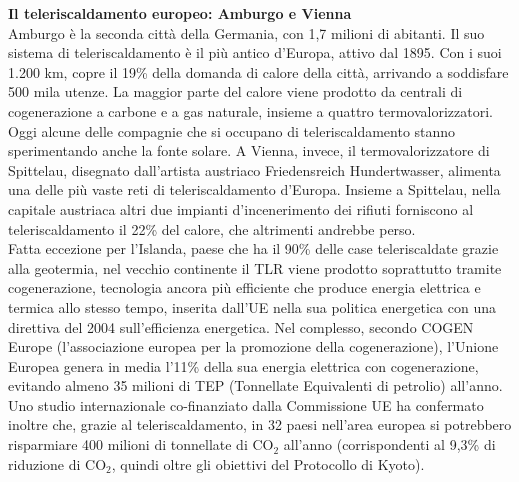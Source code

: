 \documentclass[laurea,oneside,11pt]{USiena_tesiLM}
\begin{document}
\noindent\textbf{Il teleriscaldamento europeo: Amburgo e Vienna}\\
\noindent Amburgo è la seconda città della Germania, con 1,7 milioni di abitanti. Il suo sistema di teleriscaldamento è il più antico d'Europa, attivo dal 1895. Con i suoi 1.200 km, copre il 19\% della domanda di calore della città, arrivando a soddisfare 500 mila utenze. La maggior parte del calore viene prodotto da centrali di cogenerazione a carbone e a gas naturale, insieme a quattro termovalorizzatori. Oggi alcune delle compagnie che si occupano di teleriscaldamento stanno sperimentando anche la fonte solare.
A Vienna, invece, il termovalorizzatore di Spittelau, disegnato dall’artista austriaco Friedensreich Hundertwasser, alimenta una delle più vaste reti di teleriscaldamento d'Europa. Insieme a Spittelau, nella capitale austriaca altri due impianti d'incenerimento dei rifiuti forniscono al teleriscaldamento il 22\% del calore, che altrimenti andrebbe perso.\\


Fatta eccezione per l’Islanda, paese che ha il 90\% delle case teleriscaldate grazie alla geotermia, nel vecchio continente il TLR viene prodotto soprattutto tramite cogenerazione, tecnologia ancora più efficiente che produce energia elettrica e termica allo stesso tempo, inserita dall'UE nella sua politica energetica con una direttiva del 2004 sull'efficienza energetica.
Nel complesso, secondo COGEN Europe (l'associazione europea per la promozione della cogenerazione), l'Unione Europea genera in media l'11\% della sua energia elettrica con cogenerazione, evitando almeno 35 milioni di TEP (Tonnellate Equivalenti di petrolio) all'anno. Uno studio internazionale co-finanziato dalla Commissione UE ha confermato inoltre che, grazie al teleriscaldamento, in 32 paesi nell'area europea si potrebbero risparmiare 400 milioni di tonnellate di CO$_2$ all'anno (corrispondenti al 9,3\% di riduzione di CO$_2$, quindi oltre gli obiettivi del Protocollo di Kyoto).\\
\end{document}
